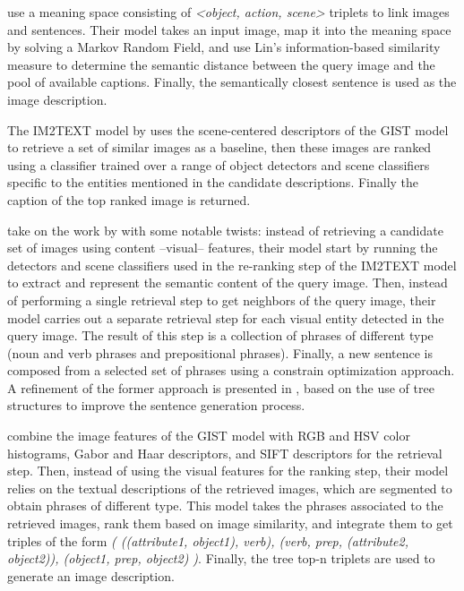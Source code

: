 \citet{Farhadi2010} use a meaning space consisting of \textit{<object, action, scene>} triplets to link images and sentences. Their model takes an input image, map it into the meaning space by solving a Markov Random Field, and use Lin's information-based similarity measure \citep{Lin1998} to determine the semantic distance between the query image and the pool of available captions. Finally, the semantically closest sentence is used as the image description.

The IM2TEXT model by \citet{Ordonez2011} uses the scene-centered descriptors of the GIST model \citep{Oliva2006, Torralba2008} to retrieve a set of similar images as a baseline, then these images are ranked using a classifier trained over a range of object detectors and scene classifiers specific to the entities mentioned in the candidate descriptions. Finally the caption of the top ranked image is returned. 

\citet{Kuznetsova2012} take on the work by \citet{Ordonez2011} with some notable twists: instead of retrieving a candidate set of images using content --visual-- features, their model start by running the detectors and scene classifiers used in the re-ranking step of the IM2TEXT model to extract and represent the semantic content of the query image. Then, instead of performing a single retrieval step to get neighbors of the query image, their model carries out a separate retrieval step for each visual entity detected in the query image. The result of this step is a collection of phrases of different type (noun and verb phrases and prepositional phrases). Finally, a new sentence is composed from a selected set of phrases using a constrain optimization approach. A refinement of the former approach is presented in \citet{Kuznetsova2014}, based on the use of tree structures to improve the sentence generation process.

\citet{Gupta2012} combine the image features of the GIST model with RGB and HSV color histograms, Gabor and Haar descriptors, and SIFT \citep{Lowe2004} descriptors for the retrieval step. Then, instead of using the visual features for the ranking step, their model relies on the textual descriptions of the retrieved images, which are segmented to obtain phrases of different type. This model takes the phrases associated to the retrieved images, rank them based on image similarity, and integrate them to get triples of the form \textit{( ((attribute1, object1), verb), (verb, prep, (attribute2, object2)), (object1, prep, object2) )}. Finally, the tree top-n triplets are used to generate an image description.

